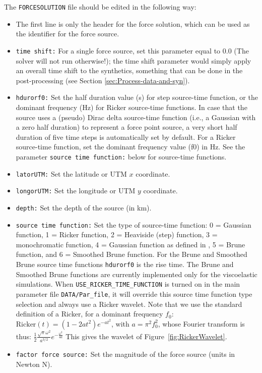 \noindent The \texttt{FORCESOLUTION} file should be edited in the
following way:
\begin{itemize}
\item The first line is only the header for the force solution, which can
be used as the identifier for the force source.
\item \texttt{time shift:} For a single force source, set
this  parameter equal to $0.0$ (The solver will not run otherwise!); the time
shift parameter would simply apply an overall time shift to the synthetics,
something that can be done in the post-processing (see Section \ref{sec:Process-data-and-syn}).
\item \texttt{hdurorf0:} Set the half duration value (s) for step source-time
function, or the dominant frequency (Hz) for Ricker source-time functions.
In case that the source uses a (pseudo) Dirac delta source-time function (i.e., a Gaussian with a zero half duration) to represent
a force point source, a very short half duration of five time steps is automatically set by default.
For a Ricker source-time function, set the dominant frequency value (f0) in Hz.
See the parameter \texttt{source time function:} below for source-time functions.
\item \texttt{latorUTM:} Set the latitude or UTM $x$ coordinate.
\item \texttt{longorUTM:} Set the longitude or UTM $y$ coordinate.
\item \texttt{depth:} Set the depth of the source (in km).
\item \texttt{source time function:} Set the type of source-time function: 0 = Gaussian function, 1 = Ricker function, 2 = Heaviside (step) function, 3 = monochromatic function, 4 = Gaussian function as defined in \citet{Meschede2011}, 5 = Brune function, and 6 = Smoothed Brune function. For the Brune and Smoothed Brune source time functions \texttt{hdurorf0} is the rise time. The Brune and Smoothed Brune functions are currently implemented only for the viscoelastic simulations.
When {\texttt{USE\_RICKER\_TIME\_FUNCTION}} is turned on in the main parameter file \texttt{DATA/Par\_file},
it will override this source time function type selection and always use a Ricker wavelet.
Note that we use the standard definition of a Ricker, for a dominant frequency $f_0$:
$\mathrm{Ricker}(t) = (1 - 2 a t^2) e^{-a t^2}$, with $a = \pi^2 f_0^2$,
whose Fourier transform is thus:
$\frac{1}{2} \frac{\sqrt{\pi}\omega^2}{a^{3/2}}e^{-\frac{\omega^2}{4 a}}$
This gives the wavelet of Figure~\ref{fig:RickerWavelet}.
\item \texttt{factor force source:} Set the magnitude of the force source (units in Newton N).

\end{itemize}

